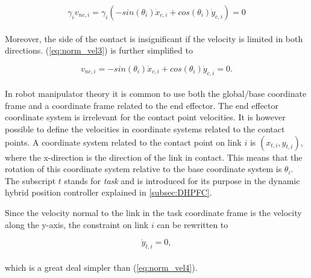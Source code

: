 \begin{equation}\label{eq:norm_vel3}
    \gamma_i v_{nc,i} = \gamma_i(-sin(\theta_i) \dot{x}_{c,i} + cos(\theta_i) \dot{y}_{c,i}) = 0
\end{equation}
\\
Moreover, the side of the contact is insignificant if the velocity is limited in both directions. (\ref{eq:norm_vel3}) is further simplified to

\begin{equation}\label{eq:norm_vel4}
    v_{nc,i} = -sin(\theta_i) \dot{x}_{c,i} + cos(\theta_i) \dot{y}_{c,i} = 0.
\end{equation}
\\
In robot manipulator theory it is common to use both the global/base coordinate frame and a coordinate frame related to the end effector. The end effector coordinate system is irrelevant for the contact point velocities. It is however possible to define the velocities in coordinate systems related to the contact points. A coordinate system related to the contact point on link $i$ is $(x_{t,i}, y_{t,i})$, where the x-direction is the direction of the link in contact. This means that the rotation of this coordinate system relative to the base coordinate system is $\theta_i$. The subscript $t$ stands for \textit{task} and is introduced for its purpose in the dynamic hybrid position controller explained in \ref{subsec:DHPFC}.

Since the velocity normal to the link in the task coordinate frame is the velocity along the y-axis, the constraint on link $i$ can be rewritten to

\begin{equation}\label{eq:norm_vel5}
    \dot{y}_{t,i} = 0,
\end{equation}
\\
which is a great deal simpler than (\ref{eq:norm_vel4}).